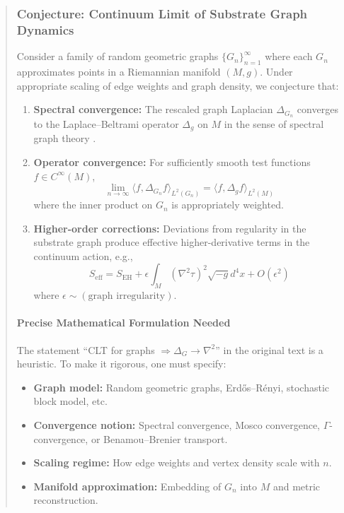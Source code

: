 \documentclass[11pt,titlepage]{article}
\begin{document}
\begin{abstract}
\subsubsection{Conjecture: Continuum Limit of Substrate Graph Dynamics}
\label{conj:graph-continuum}

\begin{tcolorbox}[colback=yellow!5!white,colframe=yellow!75!black,title=Research Direction (Graph Continuum Limit)]
\label{conj:graph-limit}
Consider a family of random geometric graphs $\{G_n\}_{n=1}^\infty$ where each $G_n$ approximates points in a Riemannian manifold $(M,g)$. Under appropriate scaling of edge weights and graph density, we conjecture that:

\begin{enumerate}
\item \textbf{Spectral convergence:} The rescaled graph Laplacian $\Delta_{G_n}$ converges to the Laplace--Beltrami operator $\Delta_g$ on $M$ in the sense of spectral graph theory \cite{Chung1997}.

\item \textbf{Operator convergence:} For sufficiently smooth test functions $f \in C^\infty(M)$,
\[
\lim_{n \to \infty} \langle f, \Delta_{G_n} f \rangle_{L^2(G_n)} = \langle f, \Delta_g f \rangle_{L^2(M)}
\]
where the inner product on $G_n$ is appropriately weighted.

\item \textbf{Higher-order corrections:} Deviations from regularity in the substrate graph produce effective higher-derivative terms in the continuum action, e.g.,
\[
S_{\text{eff}} = S_{\text{EH}} + \epsilon \int_M (\nabla^2 \tau)^2 \sqrt{-g} d^4x + O(\epsilon^2)
\]
where $\epsilon \sim (\text{graph irregularity})$.
\end{enumerate}
\end{tcolorbox}

\paragraph{Precise Mathematical Formulation Needed}
The statement ``CLT for graphs $\Rightarrow \Delta_G \to \nabla^2$'' in the original text is a heuristic. To make it rigorous, one must specify:

\begin{itemize}
\item \textbf{Graph model:} Random geometric graphs, Erdős--Rényi, stochastic block model, etc.
\item \textbf{Convergence notion:} Spectral convergence, Mosco convergence, $\Gamma$-convergence, or Benamou--Brenier transport.
\item \textbf{Scaling regime:} How edge weights and vertex density scale with $n$.
\item \textbf{Manifold approximation:} Embedding of $G_n$ into $M$ and metric reconstruction.
\end{itemize}


\end{abstract}
\end{document}

